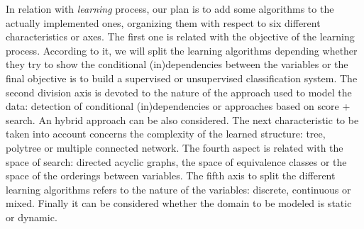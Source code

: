 In relation with {\em learning} process, our plan is to add some
algorithms to the actually implemented ones, organizing them
with respect to six different characteristics or axes. The first one is related 
with the objective of the learning process. According to it, we
will split the learning algorithms depending whether they try to
show the conditional (in)dependencies between the variables or 
the final objective is to build a supervised or unsupervised classification system.
The second division axis is devoted to the nature of the approach used
to model the data: detection of conditional (in)dependencies or
approaches based on score + search. An hybrid approach can
be also considered. The next characteristic to be taken into account
concerns the complexity of the learned structure: tree, polytree
or multiple connected network. The fourth aspect is related with
the space of search: directed acyclic graphs, the space of
equivalence classes or the space of the orderings between variables.
The fifth axis to split the different learning
algorithms refers to the nature of the variables: discrete, continuous
or mixed. Finally it can be considered whether the
domain to be modeled is static or dynamic.


